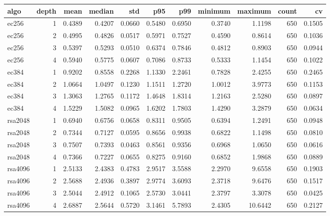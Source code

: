\begin{tabular}{lrrrrrrrrrr}
\toprule
algo & depth & mean & median & std & p95 & p99 & minimum & maximum & count & cv \\
\midrule
ec256 & 1 & 0.4389 & 0.4207 & 0.0660 & 0.5480 & 0.6950 & 0.3740 & 1.1198 & 650 & 0.1505 \\
ec256 & 2 & 0.4995 & 0.4826 & 0.0517 & 0.5971 & 0.7527 & 0.4590 & 0.8614 & 650 & 0.1036 \\
ec256 & 3 & 0.5397 & 0.5293 & 0.0510 & 0.6374 & 0.7846 & 0.4812 & 0.8903 & 650 & 0.0944 \\
ec256 & 4 & 0.5940 & 0.5775 & 0.0607 & 0.7086 & 0.8733 & 0.5333 & 1.1454 & 650 & 0.1022 \\
ec384 & 1 & 0.9202 & 0.8558 & 0.2268 & 1.1330 & 2.2461 & 0.7828 & 2.4255 & 650 & 0.2465 \\
ec384 & 2 & 1.0664 & 1.0497 & 0.1230 & 1.1511 & 1.2720 & 1.0012 & 3.9773 & 650 & 0.1153 \\
ec384 & 3 & 1.3063 & 1.2765 & 0.1172 & 1.4648 & 1.8314 & 1.2163 & 2.5280 & 650 & 0.0897 \\
ec384 & 4 & 1.5229 & 1.5082 & 0.0965 & 1.6202 & 1.7803 & 1.4290 & 3.2879 & 650 & 0.0634 \\
rsa2048 & 1 & 0.6940 & 0.6756 & 0.0658 & 0.8311 & 0.9505 & 0.6394 & 1.2491 & 650 & 0.0948 \\
rsa2048 & 2 & 0.7344 & 0.7127 & 0.0595 & 0.8656 & 0.9938 & 0.6822 & 1.1498 & 650 & 0.0810 \\
rsa2048 & 3 & 0.7507 & 0.7393 & 0.0463 & 0.8561 & 0.9356 & 0.6968 & 1.0650 & 650 & 0.0616 \\
rsa2048 & 4 & 0.7366 & 0.7227 & 0.0655 & 0.8275 & 0.9160 & 0.6852 & 1.9868 & 650 & 0.0889 \\
rsa4096 & 1 & 2.5133 & 2.4383 & 0.4783 & 2.9517 & 3.5588 & 2.2970 & 9.6558 & 650 & 0.1903 \\
rsa4096 & 2 & 2.5688 & 2.4936 & 0.3897 & 2.9774 & 3.6093 & 2.3718 & 9.6476 & 650 & 0.1517 \\
rsa4096 & 3 & 2.5044 & 2.4912 & 0.1065 & 2.5730 & 3.0441 & 2.3797 & 3.3078 & 650 & 0.0425 \\
rsa4096 & 4 & 2.6887 & 2.5644 & 0.5720 & 3.1461 & 5.7893 & 2.4305 & 10.6442 & 650 & 0.2127 \\
\bottomrule
\end{tabular}
